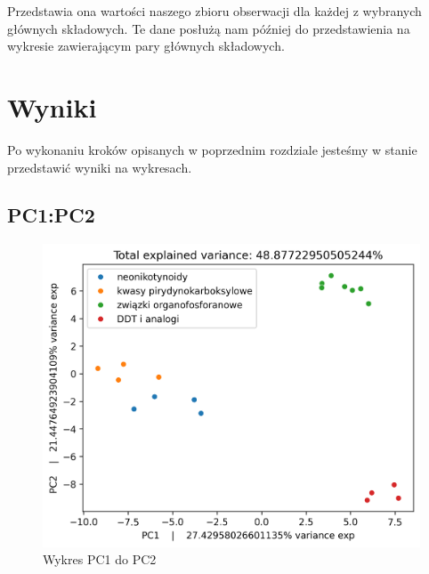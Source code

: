 \documentclass[12pt, a4paper]{article}
\begin{document}
        Przedstawia ona wartości naszego zbioru obserwacji dla każdej z wybranych głównych składowych. Te dane posłużą nam później do
        przedstawienia na wykresie zawierającym pary głównych składowych.

\section{Wyniki}

    Po wykonaniu kroków opisanych w poprzednim rozdziale jesteśmy w stanie przedstawić wyniki na wykresach.     

    \subsection*{PC1:PC2}
        \begin{figure}[H]
            \centering
            \includegraphics{12.png}
            \caption{Wykres PC1 do PC2}
        \end{figure}
\end{document}
